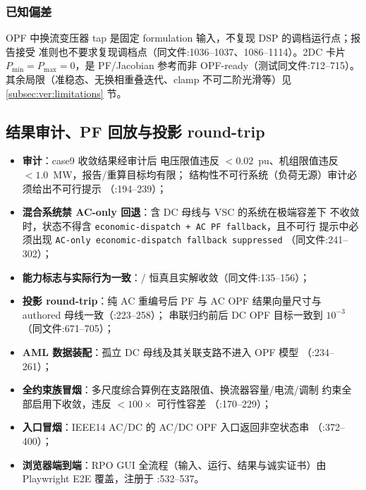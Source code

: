 \subsubsection*{已知偏差}
OPF 中换流变压器 tap 是固定 formulation 输入，不复现 DSP 的调档运行点；报告接受
准则也不要求复现调档点（同文件:1036--1037、1086--1114）。2DC 卡片
$P_{\min}=P_{\max}=0$，是 PF/Jacobian 参考而非 OPF-ready（测试同文件:712--715）。
其余局限（准稳态、无换相重叠迭代、clamp 不可二阶光滑等）见
\ref{subsec:ver:limitations} 节。

\subsection{结果审计、PF 回放与投影 round-trip}\label{subsec:ver:audit}

\begin{itemize}
  \item \textbf{ 审计}：case9 收敛结果经审计后
        电压限值违反 $<0.02$~pu、机组限值违反 $<1.0$~MW，报告/重算目标均有限；
        结构性不可行系统（负荷无源）审计必须给出不可行提示
        （:194--239）；
  \item \textbf{混合系统禁 AC-only 回退}：含 DC 母线与 VSC 的系统在极端容差下
        不收敛时，状态不得含 \texttt{economic-dispatch + AC PF fallback}，且不可行
        提示中必须出现 \texttt{AC-only economic-dispatch fallback suppressed}
        （同文件:241--302）；
  \item \textbf{能力标志与实际行为一致}：/
         恒真且实解收敛（同文件:135--156）；
  \item \textbf{投影 round-trip}：纯 AC 重编号后 PF 与 AC OPF 结果向量尺寸与
        authored 母线一致（:223--258）；
        串联归约前后 DC OPF 目标一致到 $10^{-3}$（同文件:671--705）；
  \item \textbf{AML 数据装配}：孤立 DC 母线及其关联支路不进入 OPF 模型
        （:234--261）；
  \item \textbf{全约束族冒烟}：多尺度综合算例在支路限值、换流器容量/电流/调制
        约束全部启用下收敛，违反 $<100\times$ 可行性容差
        （:170--229）；
  \item \textbf{入口冒烟}：IEEE14 AC/DC 的 AC/DC OPF 入口返回非空状态串
        （:372--400）；
  \item \textbf{浏览器端到端}：RPO GUI 全流程（输入、运行、结果与诚实证书）由
        Playwright E2E 覆盖，注册于 :532--537。
\end{itemize}


